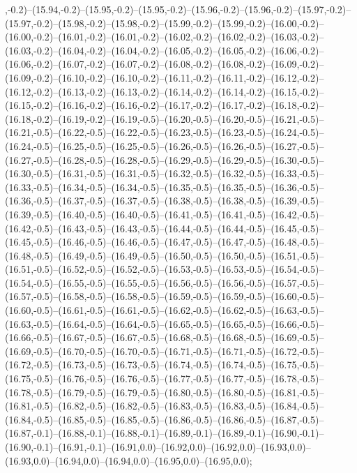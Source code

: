 ,-0.2)--(15.94,-0.2)--(15.95,-0.2)--(15.95,-0.2)--(15.96,-0.2)--(15.96,-0.2)--(15.97,-0.2)--(15.97,-0.2)--(15.98,-0.2)--(15.98,-0.2)--(15.99,-0.2)--(15.99,-0.2)--(16.00,-0.2)--(16.00,-0.2)--(16.01,-0.2)--(16.01,-0.2)--(16.02,-0.2)--(16.02,-0.2)--(16.03,-0.2)--(16.03,-0.2)--(16.04,-0.2)--(16.04,-0.2)--(16.05,-0.2)--(16.05,-0.2)--(16.06,-0.2)--(16.06,-0.2)--(16.07,-0.2)--(16.07,-0.2)--(16.08,-0.2)--(16.08,-0.2)--(16.09,-0.2)--(16.09,-0.2)--(16.10,-0.2)--(16.10,-0.2)--(16.11,-0.2)--(16.11,-0.2)--(16.12,-0.2)--(16.12,-0.2)--(16.13,-0.2)--(16.13,-0.2)--(16.14,-0.2)--(16.14,-0.2)--(16.15,-0.2)--(16.15,-0.2)--(16.16,-0.2)--(16.16,-0.2)--(16.17,-0.2)--(16.17,-0.2)--(16.18,-0.2)--(16.18,-0.2)--(16.19,-0.2)--(16.19,-0.5)--(16.20,-0.5)--(16.20,-0.5)--(16.21,-0.5)--(16.21,-0.5)--(16.22,-0.5)--(16.22,-0.5)--(16.23,-0.5)--(16.23,-0.5)--(16.24,-0.5)--(16.24,-0.5)--(16.25,-0.5)--(16.25,-0.5)--(16.26,-0.5)--(16.26,-0.5)--(16.27,-0.5)--(16.27,-0.5)--(16.28,-0.5)--(16.28,-0.5)--(16.29,-0.5)--(16.29,-0.5)--(16.30,-0.5)--(16.30,-0.5)--(16.31,-0.5)--(16.31,-0.5)--(16.32,-0.5)--(16.32,-0.5)--(16.33,-0.5)--(16.33,-0.5)--(16.34,-0.5)--(16.34,-0.5)--(16.35,-0.5)--(16.35,-0.5)--(16.36,-0.5)--(16.36,-0.5)--(16.37,-0.5)--(16.37,-0.5)--(16.38,-0.5)--(16.38,-0.5)--(16.39,-0.5)--(16.39,-0.5)--(16.40,-0.5)--(16.40,-0.5)--(16.41,-0.5)--(16.41,-0.5)--(16.42,-0.5)--(16.42,-0.5)--(16.43,-0.5)--(16.43,-0.5)--(16.44,-0.5)--(16.44,-0.5)--(16.45,-0.5)--(16.45,-0.5)--(16.46,-0.5)--(16.46,-0.5)--(16.47,-0.5)--(16.47,-0.5)--(16.48,-0.5)--(16.48,-0.5)--(16.49,-0.5)--(16.49,-0.5)--(16.50,-0.5)--(16.50,-0.5)--(16.51,-0.5)--(16.51,-0.5)--(16.52,-0.5)--(16.52,-0.5)--(16.53,-0.5)--(16.53,-0.5)--(16.54,-0.5)--(16.54,-0.5)--(16.55,-0.5)--(16.55,-0.5)--(16.56,-0.5)--(16.56,-0.5)--(16.57,-0.5)--(16.57,-0.5)--(16.58,-0.5)--(16.58,-0.5)--(16.59,-0.5)--(16.59,-0.5)--(16.60,-0.5)--(16.60,-0.5)--(16.61,-0.5)--(16.61,-0.5)--(16.62,-0.5)--(16.62,-0.5)--(16.63,-0.5)--(16.63,-0.5)--(16.64,-0.5)--(16.64,-0.5)--(16.65,-0.5)--(16.65,-0.5)--(16.66,-0.5)--(16.66,-0.5)--(16.67,-0.5)--(16.67,-0.5)--(16.68,-0.5)--(16.68,-0.5)--(16.69,-0.5)--(16.69,-0.5)--(16.70,-0.5)--(16.70,-0.5)--(16.71,-0.5)--(16.71,-0.5)--(16.72,-0.5)--(16.72,-0.5)--(16.73,-0.5)--(16.73,-0.5)--(16.74,-0.5)--(16.74,-0.5)--(16.75,-0.5)--(16.75,-0.5)--(16.76,-0.5)--(16.76,-0.5)--(16.77,-0.5)--(16.77,-0.5)--(16.78,-0.5)--(16.78,-0.5)--(16.79,-0.5)--(16.79,-0.5)--(16.80,-0.5)--(16.80,-0.5)--(16.81,-0.5)--(16.81,-0.5)--(16.82,-0.5)--(16.82,-0.5)--(16.83,-0.5)--(16.83,-0.5)--(16.84,-0.5)--(16.84,-0.5)--(16.85,-0.5)--(16.85,-0.5)--(16.86,-0.5)--(16.86,-0.5)--(16.87,-0.5)--(16.87,-0.1)--(16.88,-0.1)--(16.88,-0.1)--(16.89,-0.1)--(16.89,-0.1)--(16.90,-0.1)--(16.90,-0.1)--(16.91,-0.1)--(16.91,0.0)--(16.92,0.0)--(16.92,0.0)--(16.93,0.0)--(16.93,0.0)--(16.94,0.0)--(16.94,0.0)--(16.95,0.0)--(16.95,0.0);